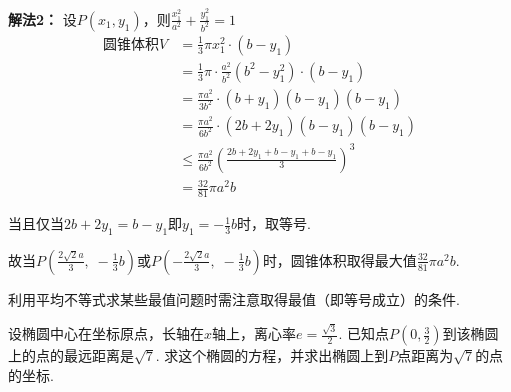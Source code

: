 \begin{solution}
\noindent
\begin{minipage}{.54\textwidth}
\textbf{解法2：} 设$P(x_1,y_1)$，则$\frac{x^2_1}{a^2}+\frac{y^2_1}{b^2}=1$
\[\begin{split}
    \text{圆锥体积}V&=\frac{1}{3}\pi x^2_1\cdot (b-y_1)\\
    &=\frac{1}{3}\pi \cdot \frac{a^2}{b^2}(b^2-y^2_1)\cdot (b-y_1)\\
    &=\frac{\pi a^2}{3b^2}\cdot (b+y_1)(b-y_1)(b-y_1)\\
    &=\frac{\pi a^2}{6b^2}\cdot (2b+2y_1)(b-y_1)(b-y_1)\\
    &\le \frac{\pi a^2}{6b^2}\left(\frac{2b+2y_1+b-y_1+b-y_1}{3}\right)^3\\
&=\frac{32}{81}\pi a^2b
\end{split}\]
\end{minipage}\hfill
\begin{minipage}{.45\textwidth}
    \centering
{}    
\end{minipage}

当且仅当$2b+2y_1=b-y_1$即$y_1=-\frac{1}{3}b$时，取等号. 

故当$P\left(\frac{2\sqrt{2}a}{3},\; -\frac{1}{3}b\right)$或$P\left(-\frac{2\sqrt{2}a}{3},\; -\frac{1}{3}b\right)$时，圆锥体积取得最大值$\frac{32}{81}\pi a^2b$.
\end{solution}

\begin{remark}
    利用平均不等式求某些最值问题时需注意取得最值（即等号成立）的条件.
\end{remark}

\begin{example}
设椭圆中心在坐标原点，长轴在$x$轴上，离心率$e=\frac{\sqrt{3}}{2}$. 已知点$P\left(0,\frac{3}{2}\right)$到该椭圆上的点的最远距离是$\sqrt{7}$. 求这个椭圆的方程，并求出椭圆上到$P$点距离为$\sqrt{7}$的点的坐标.
\end{example}

